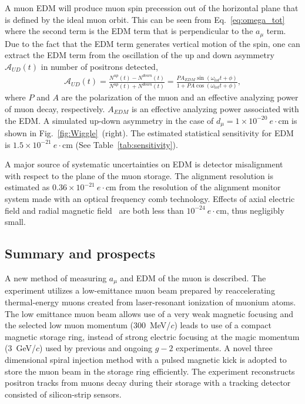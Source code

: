  A muon EDM will produce muon spin precession out of
the horizontal plane that is defined by the ideal muon orbit.
This can be seen from Eq.~\ref{eq:omega_tot}
where the second term is the EDM term that is perpendicular
to the $a_\mu$ term. Due to the fact that the EDM term generates
vertical motion of the spin, one can extract the EDM term
from the oscillation of the up and down asymmetry $\mathcal{A}_{UD}(t)$ in
number of positrons detected,
\begin{eqnarray}
\mathcal{A}_{UD}(t) = 
\frac{N^{up}(t) - N^{down}(t)}{N^{up}(t) + N^{down}(t)} =
\frac{PA_{EDM} \sin{(\omega_{tot}t+\phi)}}{1+ P A \cos{(\omega_{tot}t+\phi)}},
\end{eqnarray}
where $P$ and $A$ are the polarization of the muon and an effective analyzing power of muon decay, respectively. $A_{EDM}$ is an effective analyzing power associated with the EDM.
A simulated up-down asymmetry in the case of $d_{\mu}=1\times 10^{-20}~e\cdot\mbox{cm}$ 
is shown in Fig.~\ref{fig:Wiggle}~(right).
The estimated statistical sensitivity for EDM is $1.5\times 10^{-21}~e\cdot\mbox{cm}$ (See Table~\ref{tab:sensitivity}).

A major source of systematic uncertainties on EDM is detector misalignment with respect to
the plane of the muon storage. The alignment resolution is estimated as 
$0.36\times 10^{-21}~e\cdot\mbox{cm}$ from the resolution 
of the alignment monitor system made with an optical frequency comb technology.
Effects of axial electric field and radial magnetic field~\cite{Silenko:2017vvd}
are both less than $10^{-24}~e\cdot\mbox{cm}$, thus negligibly small.

\subsection{Summary and prospects}\label{sec:Summary} 

A new method of measuring $a_{\mu}$ and EDM of the muon is described.
The experiment utilizes a low-emittance muon beam prepared by 
reaccelerating thermal-energy muons created from laser-resonant 
ionization of muonium atoms. The low emittance muon beam allows use of a very
weak magnetic focusing and the selected low muon momentum (300~MeV/$c$) leads to use of a compact magnetic storage ring, 
instead of strong electric focusing at the magic momentum (3~GeV/$c$) used by previous and ongoing $g-2$ experiments.
A novel three dimensional spiral injection method with a pulsed magnetic kick
is adopted to store the muon beam in the storage ring efficiently.
The experiment reconstructs positron tracks from muons decay during their storage 
with a tracking detector consisted of silicon-strip sensors.


